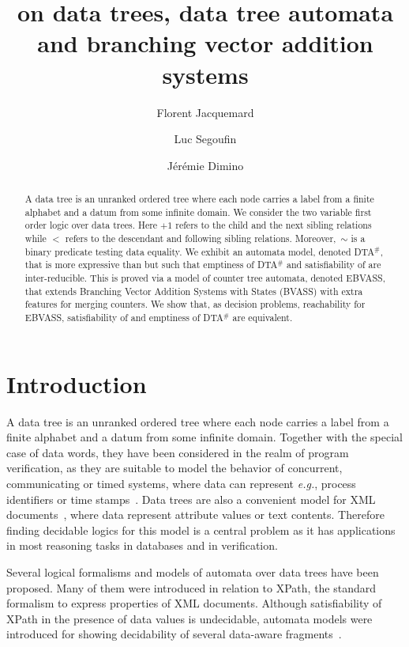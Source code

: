 \documentclass{CSML}
\title[\fotwo on data trees]{\fotwo on data trees, data tree automata and branching vector addition systems}
\author[F.~Jacquemard]{Florent Jacquemard}
\author[L.~Segoufin]{Luc Segoufin}
\author{J\'er\'emie Dimino}
\newcommand\bvass{\textup{BVASS}\xspace}
\newcommand\ebvass{\textup{EBVASS}\xspace}
\newcommand\xpath{\textup{XPath}\xspace}
\newcommand\dad{\textup{DTA}$^\#$\xspace}
\begin{document}
\begin{abstract}
  A data tree is an unranked ordered tree where each node carries a label from
  a finite alphabet and a datum from some infinite domain.  We consider the two
  variable first order logic \fotwo over data trees.  Here $+1$ refers to the
  child and the next sibling relations while $<$ refers to the descendant and
  following sibling relations.  Moreover,~$\sim$ is a binary predicate testing
  data equality.  We exhibit an automata model, denoted \dad, that is more
  expressive than \fotwo but such that emptiness of \dad and satisfiability of
  \fotwo are inter-reducible.  This is proved via a model of counter tree
  automata, denoted \ebvass, that extends Branching Vector Addition Systems
  with States (\bvass) with extra features for merging counters. We show that,
  as decision problems, reachability for \ebvass, satisfiability of \fotwo and
  emptiness of \dad are equivalent.
\end{abstract}

\maketitle

\section*{Introduction}

A data tree is an unranked ordered tree where each node carries a label from a
finite alphabet and a datum from some infinite domain. Together with the
special case of data words, they have been considered in the realm of program
verification, as they are suitable to model the behavior of concurrent,
communicating or timed systems, where data can represent \textit{e.g.}, process
identifiers or time stamps~\cite{Alur12AAA,BCGK12fossacs,Bouyer02ipl}.  Data
trees are also a convenient model for XML documents~\cite{BojanczykMSS09jacm},
where data represent attribute values or text contents.  Therefore finding
decidable logics for this model is a central problem as it has applications in
most reasoning tasks in databases and in verification.

Several logical formalisms and models of automata over data trees have been
proposed. Many of them were introduced in relation to \xpath, the standard
formalism to express properties of XML documents. Although satisfiability of
\xpath in the presence of data values is undecidable, automata models were
introduced for showing decidability of several 
data-aware fragments~\cite{FS11,BojanczykMSS09jacm,Fig10,F09,JL08}.
\end{document}
